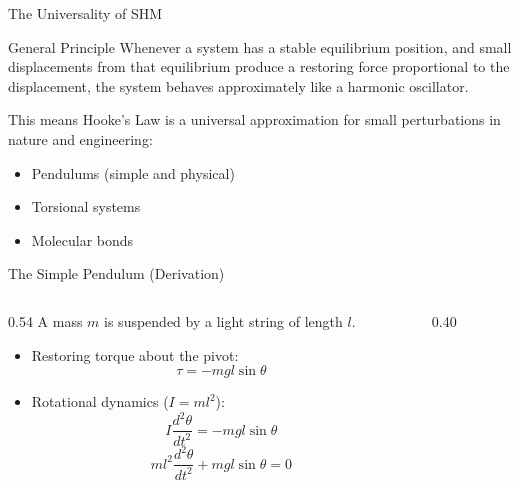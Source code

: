 \documentclass[aspectratio=169,xcolor=dvipsnames]{beamer}
\begin{document}
\begin{frame}{The Universality of SHM}
  \begin{umlaw}{General Principle}
    Whenever a system has a stable equilibrium position, and small displacements from that equilibrium produce a restoring force proportional to the displacement, the system behaves approximately like a harmonic oscillator.
  \end{umlaw}
  \pause
  \vspace{0.4em}
  This means Hooke's Law is a universal approximation for small perturbations in nature and engineering:
  \begin{itemize}
    \item Pendulums (simple and physical)
    \item Torsional systems
    \item Molecular bonds
  \end{itemize}
\end{frame}

\begin{frame}{The Simple Pendulum (Derivation)}
  \begin{columns}[T]
    \begin{column}{0.54\textwidth}
      A mass $m$ is suspended by a light string of length $l$.
      \begin{itemize}
        \item Restoring torque about the pivot:
              \[
                \tau = -mgl\sin\theta
              \]
        \item Rotational dynamics ($I = ml^2$):
              \[
                I \frac{d^2\theta}{dt^2} = -mgl\sin\theta
              \]
              \[
                ml^2 \frac{d^2\theta}{dt^2} + mgl\sin\theta = 0
              \]
      \end{itemize}
    \end{column}
    \hfill
    \begin{column}{0.40\textwidth}
      \centering
    \end{column}
  \end{columns}
\end{frame}
\end{document}
